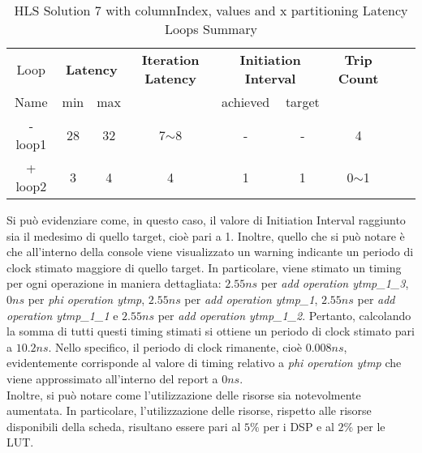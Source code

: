 \begin{table}[H]
	\centering
	\begin{tabular}{|c|c|c|c|c|c|c|c|c|}
		\hline
		\multicolumn{1}{|c|}{Loop} & \multicolumn{2}{|c|}{\textbf{Latency}} & \multicolumn{1}{c|}{\textbf{Iteration Latency}} & \multicolumn{2}{c|}{\textbf{Initiation Interval}} & \multicolumn{1}{c|}{\textbf{Trip Count}}  \\
		Name & min & max &  & achieved & target &  \\
		\hline
		- loop1 & 28 & 32 & 7$\sim$8 & - & - & 4 \\
		+ loop2 & 3 & 4 & 4 & 1 & 1 & 0$\sim$1 \\
		\hline
	\end{tabular}
	\caption{HLS Solution 7 with columnIndex, values and x partitioning Latency Loops Summary}
	\label{tab:hls-solution-7-columnindex-values-x-partitioning-loop-summary}
\end{table}

Si può evidenziare come, in questo caso, il valore di Initiation Interval raggiunto sia il medesimo di quello target, cioè pari a 1. Inoltre, quello che si può notare è che all'interno della console viene visualizzato un warning indicante un periodo di clock stimato maggiore di quello target. In particolare, viene stimato un timing per ogni operazione in maniera dettagliata: $2.55 ns$ per \textit{add operation ytmp\_1\_3}, $0 ns$ per \textit{phi operation ytmp}, $2.55 ns$ per \textit{add operation ytmp\_1}, $2.55 ns$ per \textit{add operation ytmp\_1\_1} e $2.55 ns$ per \textit{add operation ytmp\_1\_2}. Pertanto, calcolando la somma di tutti questi timing stimati si ottiene un periodo di clock stimato pari a $10.2 ns$. Nello specifico, il periodo di clock rimanente, cioè $0.008 ns$, evidentemente corrisponde al valore di timing relativo a \textit{phi operation ytmp} che viene approssimato all'interno del report a $0 ns$. 
\\
Inoltre, si può notare come l'utilizzazione delle risorse sia notevolmente aumentata. In particolare, l'utilizzazione delle risorse, rispetto alle risorse disponibili della scheda, risultano essere pari al $5\%$ per i DSP e al $2\%$ per le LUT.

